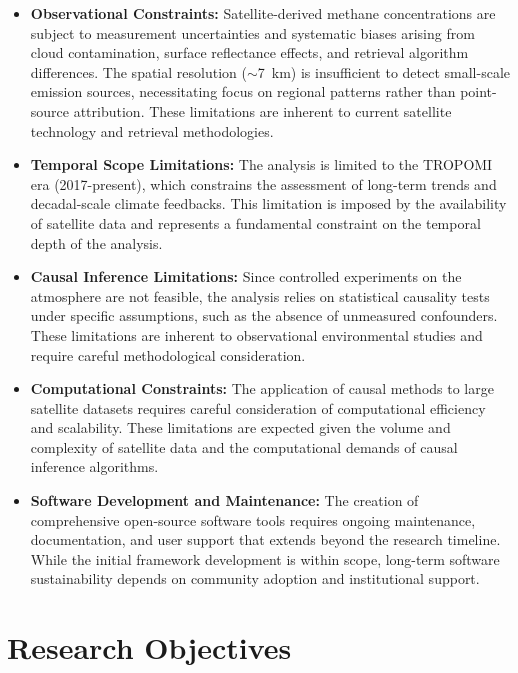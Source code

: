 \begin{itemize}
	\item \textbf{Observational Constraints:} Satellite-derived methane concentrations are subject to measurement uncertainties and systematic biases arising from cloud contamination, surface reflectance effects, and retrieval algorithm differences. The spatial resolution ($\sim$7~km) is insufficient to detect small-scale emission sources, necessitating focus on regional patterns rather than point-source attribution. These limitations are inherent to current satellite technology and retrieval methodologies.

	\item \textbf{Temporal Scope Limitations:} The analysis is limited to the TROPOMI era (2017-present), which constrains the assessment of long-term trends and decadal-scale climate feedbacks. This limitation is imposed by the availability of satellite data and represents a fundamental constraint on the temporal depth of the analysis.

	\item \textbf{Causal Inference Limitations:} Since controlled experiments on the atmosphere are not feasible, the analysis relies on statistical causality tests under specific assumptions, such as the absence of unmeasured confounders. These limitations are inherent to observational environmental studies and require careful methodological consideration.

	\item \textbf{Computational Constraints:} The application of causal methods to large satellite datasets requires careful consideration of computational efficiency and scalability. These limitations are expected given the volume and complexity of satellite data and the computational demands of causal inference algorithms.

	\item \textbf{Software Development and Maintenance:} The creation of comprehensive open-source software tools requires ongoing maintenance, documentation, and user support that extends beyond the research timeline. While the initial framework development is within scope, long-term software sustainability depends on community adoption and institutional support.
\end{itemize}


\section{Research Objectives}
\label{sec:research-objectives}

